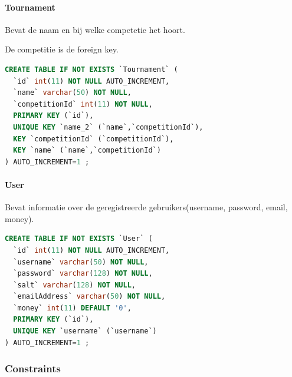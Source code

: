 \documentclass[11pt]{article}
\begin{document}
        
        
        
    \paragraph{Tournament}
        Bevat de naam en bij welke competetie het hoort.
        
        De competitie is de foreign key.
        
        \begin{framed}
        \begin{lstlisting}[language=sql]
CREATE TABLE IF NOT EXISTS `Tournament` (
  `id` int(11) NOT NULL AUTO_INCREMENT,
  `name` varchar(50) NOT NULL,
  `competitionId` int(11) NOT NULL,
  PRIMARY KEY (`id`),
  UNIQUE KEY `name_2` (`name`,`competitionId`),
  KEY `competitionId` (`competitionId`),
  KEY `name` (`name`,`competitionId`)
) AUTO_INCREMENT=1 ;
        \end{lstlisting}
        \end{framed}
        
        
        
        
    \paragraph{User}
        Bevat informatie over de geregistreerde gebruikers(username, password, email, money).
        
        \begin{framed}
        \begin{lstlisting}[language=sql]
CREATE TABLE IF NOT EXISTS `User` (
  `id` int(11) NOT NULL AUTO_INCREMENT,
  `username` varchar(50) NOT NULL,
  `password` varchar(128) NOT NULL,
  `salt` varchar(128) NOT NULL,
  `emailAddress` varchar(50) NOT NULL,
  `money` int(11) DEFAULT '0',
  PRIMARY KEY (`id`),
  UNIQUE KEY `username` (`username`)
) AUTO_INCREMENT=1 ;
        \end{lstlisting}
        \end{framed}




\subsubsection{Constraints}
\end{document}
